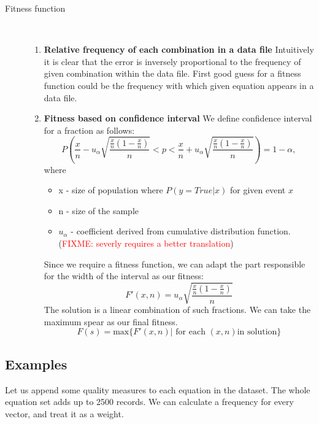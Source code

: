 \begin{description}
    \item[Fitness function] \hfill \\
    \begin{enumerate}
        \item \textbf{Relative frequency of each combination in a data file}
        Intuitively it is clear that the error is inversely proportional to the frequency of given combination within the data file.
        First good guess for a fitness function could be the frequency with which given equation appears in a data file.
        \item \textbf{Fitness based on confidence interval}
        We define confidence interval for a fraction as follows:
        \begin{equation}
            P \left( \frac{x}{n}-u_{\alpha} \sqrt{\frac{\frac{x}{n}(1-\frac{x}{n})}{n}} < p < \frac{x}{n}+u_{\alpha} \sqrt{\frac{\frac{x}{n}(1-\frac{x}{n})}{n}} \right)= 1 - \alpha,
        \end{equation}
        where
        \begin{itemize}
            \item x - size of population where $P(y=True|x)$ for given event $x$
            \item n - size of the sample
            \item $u_{\alpha}$ - coefficient derived from cumulative distribution function. (\textcolor{red}{FIXME: severly requires a better translation})
        \end{itemize}
        Since we require a fitness function, we can adapt the part responsible for the width of the interval as our fitness:
        \begin{equation}
            F'(x,n) = u_{\alpha} \sqrt{\frac{\frac{x}{n}(1-\frac{x}{n})}{n}}
        \end{equation}
        The solution is a linear combination of such fractions.
        We can take the maximum spear as our final fitness.
        \begin{equation}
            F(s) = \mbox{max}\{F'(x,n) | \mbox{ for each } (x,n) \mbox{in solution}\}
        \end{equation}

    \end{enumerate}
\end{description}

\subsection{Examples}
Let us append some quality measures to each equation in the dataset.
The whole equation set adds up to 2500 records.
We can calculate a frequency for every vector, and treat it as a weight.

